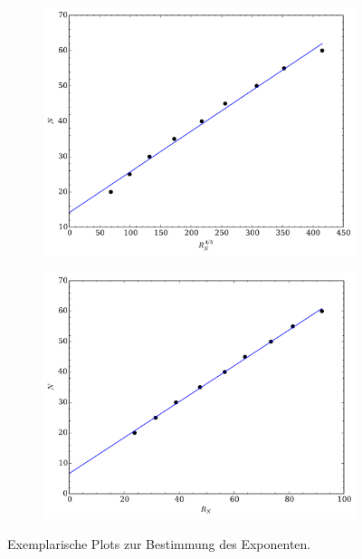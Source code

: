 \documentclass{scrartcl}
\begin{document}
\begin{figure}[H]
  \centering
  \begin{subfigure}{.48\textwidth}
    \centering
    \includegraphics[width=\textwidth]{plots/saw_N_RN43.pdf}
  \end{subfigure}
  \begin{subfigure}{.48\textwidth}
    \centering
    \includegraphics[width=\textwidth]{plots/saw_N_RN.pdf}
  \end{subfigure}
  \caption{Exemplarische Plots zur Bestimmung des Exponenten.}
  \label{fig:exponents}
\end{figure}
\end{document}
